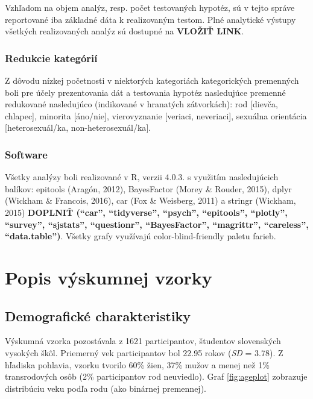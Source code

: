 \documentclass[
]{article}
\begin{document}
Vzhľadom na objem analýz, resp. počet testovaných hypotéz, sú v tejto správe reportované iba základné dáta k realizovaným testom. Plné analytické výstupy všetkých realizovaných analýz sú dostupné na \textbf{VLOŽIŤ LINK}.

\hypertarget{redukcie-kateguxf3riuxed}{%
\subsubsection{Redukcie kategórií}\label{redukcie-kateguxf3riuxed}}

Z dôvodu nízkej početnosti v niektorých kategoriách kategorických premenných boli pre účely prezentovania dát a testovania hypotéz nasledujúce premenné redukované nasledujúco (indikované v hranatých zátvorkách): rod {[}dievča, chlapec{]}, minorita {[}áno/nie{]}, vierovyznanie {[}veriaci, neveriaci{]}, sexuálna orientácia {[}heterosexuál/ka, non-heterosexuál/ka{]}.

\hypertarget{software}{%
\subsubsection{Software}\label{software}}

Všetky analýzy boli realizované v R, verzii 4.0.3. s využitím nasledujúcich balíkov: epitools (Aragón, 2012), BayesFactor (Morey \& Rouder, 2015), dplyr (Wickham \& Francois, 2016), car (Fox \& Weisberg, 2011) a stringr (Wickham, 2015) \textbf{DOPLNIŤ (``car'', ``tidyverse'', ``psych'', ``epitools'', ``plotly'', ``survey'', ``sjstats'', ``questionr'', ``BayesFactor'', ``magrittr'', ``careless'', ``data.table'')}. Všetky grafy využívajú color-blind-friendly paletu farieb.

\newpage

\hypertarget{popis-vzorky}{%
\section{Popis výskumnej vzorky}\label{popis-vzorky}}

\hypertarget{demografickuxe9-charakteristiky}{%
\subsection{Demografické charakteristiky}\label{demografickuxe9-charakteristiky}}

Výskumná vzorka pozostávala z 1621 participantov, študentov slovenských vysokých škôl. Priemerný vek participantov bol 22.95 rokov (\emph{SD} = 3.78). Z hľadiska pohlavia, vzorku tvorilo 60\% žien, 37\% mužov a menej než 1\% transrodových osôb (2\% participantov rod neuviedlo). Graf \ref{fig:ageplot} zobrazuje distribúciu veku podľa rodu (ako binárnej premennej).
\end{document}
